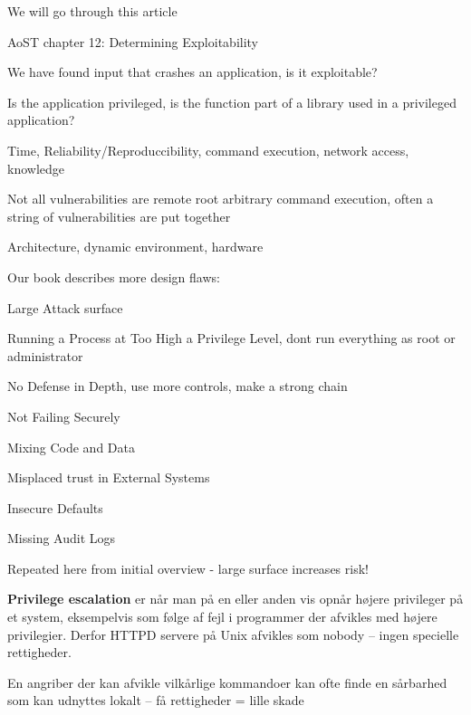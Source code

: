 \documentclass[Screen16to9,17pt]{foils}
\begin{document}
We will go through this article




\begin{list2}
\item AoST chapter 12: Determining Exploitability
\item We have found input that crashes an application, is it exploitable?
\item Is the application privileged, is the function part of a library used in a privileged application?
\item Time, Reliability/Reproduccibility, command execution, network access, knowledge
\item Not all vulnerabilities are remote root arbitrary command execution, often a string of vulnerabilities are put together
\item Architecture, dynamic environment, hardware
\end{list2}


Our book describes more design flaws:
\begin{list2}
\item Large Attack surface
\item Running a Process at Too High a Privilege Level, dont run everything as root or administrator
\item No Defense in Depth, use more controls, make a strong chain
\item Not Failing Securely
\item Mixing Code and Data
\item Misplaced trust in External Systems
\item Insecure Defaults
\item Missing Audit Logs
\end{list2}

Repeated here from initial overview - large surface increases risk!


\begin{list1}
\item {\bfseries Privilege escalation} er når man på en eller anden vis
opnår højere privileger på et system, eksempelvis som
følge af fejl i programmer der afvikles med højere
privilegier. Derfor HTTPD servere på Unix afvikles som
nobody -- ingen specielle rettigheder.
\item En angriber der kan afvikle vilkårlige kommandoer kan ofte finde
  en sårbarhed som kan udnyttes lokalt -- få rettigheder = lille skade
\end{list1}
\end{document}
